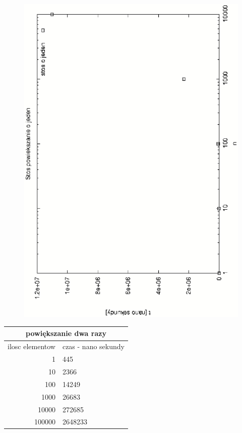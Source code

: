 \documentclass[a4paper,11pt]{report}
\begin{document}
\begin{figure}
  \begin{center}
    \includegraphics{wykresy/stos_o_jeden.eps}
    \caption{}
    \label{fig:}
  \end{center}
\end{figure}
\begin{tabular}{|rl|}
\hline
\multicolumn{2}{|c|}{powiększanie dwa razy}\\
\hline
ilosc elementow & czas - nano sekundy\\
\hline
1&445\\
10&2366\\
100&14249\\
1000&26683\\
10000&272685\\
100000&2648233\\
\hline
\end{tabular}
\end{document}
